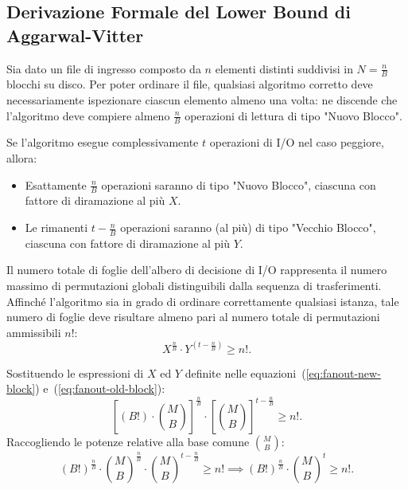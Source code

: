 \subsection{Derivazione Formale del Lower Bound di Aggarwal-Vitter}
\label{subsec:formal-derivation-av}

Sia dato un file di ingresso composto da $n$ elementi distinti suddivisi in $N = \frac{n}{B}$ blocchi su disco. Per poter ordinare il file, qualsiasi algoritmo corretto deve necessariamente ispezionare ciascun elemento almeno una volta: ne discende che l'algoritmo deve compiere almeno $\frac{n}{B}$ operazioni di lettura di tipo "Nuovo Blocco".

Se l'algoritmo esegue complessivamente $t$ operazioni di I/O nel caso peggiore, allora:
\begin{itemize}
  \item Esattamente $\frac{n}{B}$ operazioni saranno di tipo "Nuovo Blocco", ciascuna con fattore di diramazione al più $X$.
  \item Le rimanenti $t - \frac{n}{B}$ operazioni saranno (al più) di tipo "Vecchio Blocco", ciascuna con fattore di diramazione al più $Y$.
\end{itemize}

Il numero totale di foglie dell'albero di decisione di I/O rappresenta il numero massimo di permutazioni globali distinguibili dalla sequenza di trasferimenti. Affinché l'algoritmo sia in grado di ordinare correttamente qualsiasi istanza, tale numero di foglie deve risultare almeno pari al numero totale di permutazioni ammissibili $n!$:
\begin{equation}
  X^{\frac{n}{B}} \cdot Y^{\left(t - \frac{n}{B}\right)} \ge n!.
  \label{eq:io-tree-leaves-inequality}
\end{equation}

Sostituendo le espressioni di $X$ ed $Y$ definite nelle equazioni~(\ref{eq:fanout-new-block}) e~(\ref{eq:fanout-old-block}):
\begin{equation}
  \left[ (B!) \cdot \binom{M}{B} \right]^{\frac{n}{B}} \cdot \left[ \binom{M}{B} \right]^{t - \frac{n}{B}} \ge n!.
\end{equation}
Raccogliendo le potenze relative alla base comune $\binom{M}{B}$:
\begin{equation}
  (B!)^{\frac{n}{B}} \cdot \binom{M}{B}^{\frac{n}{B}} \cdot \binom{M}{B}^{t - \frac{n}{B}} \ge n! \implies (B!)^{\frac{n}{B}} \cdot \binom{M}{B}^t \ge n!.
  \label{eq:leaves-compact-inequality}
\end{equation}

